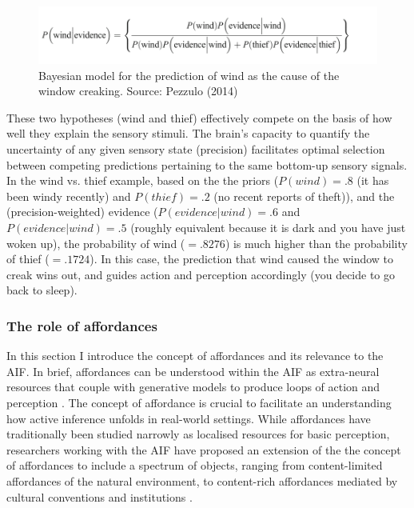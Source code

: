\begin{CJK}{UTF8}{gbsn}
\begin{figure}[htbp]
  \begin{center}
    \includegraphics[scale=.5]{images/windThief.png}
      \caption{Bayesian model for the prediction of wind as the cause of the window creaking. Source: Pezzulo (2014)}
        \label{fig:windThief}
   \end{center}
\end{figure}

These two hypotheses (wind and thief) effectively compete on the basis of how well they explain the sensory stimuli.  The brain's capacity to quantify the uncertainty of any given sensory state (precision) facilitates optimal selection between competing predictions pertaining to the same bottom-up sensory signals.  In the wind vs. thief example, based on the the priors ($P(wind) = .8$ (it has been windy recently) and $P(thief) = .2$ (no recent reports of theft)), and the (precision-weighted) evidence ($P(evidence|wind) = .6$ and $P(evidence|wind) = .5$ (roughly equivalent because it is dark and you have just woken up), the probability of wind ($= .8276$) is much higher than the probability of thief ($= .1724$).  In this case, the prediction that wind caused the window to creak wins out, and guides action and perception accordingly (you decide to go back to sleep).



\subsubsection{The role of affordances}
In this section I introduce the concept of affordances and its relevance to the AIF.  In brief, affordances can be understood within the AIF as extra-neural resources that couple with generative models to produce loops of action and perception \citep{Ramstead2016,Clark2015}.  The concept of affordance is crucial to facilitate an understanding how active inference unfolds in real-world settings.  While affordances have traditionally been studied narrowly as localised resources for basic perception, researchers working with the AIF have proposed an extension of the the concept of affordances to include a spectrum of objects, ranging from content-limited affordances of the natural environment, to content-rich affordances mediated by cultural conventions and institutions \citep[cf.][]{Roepstorff2010,Ramstead2016}.


\end{CJK}
